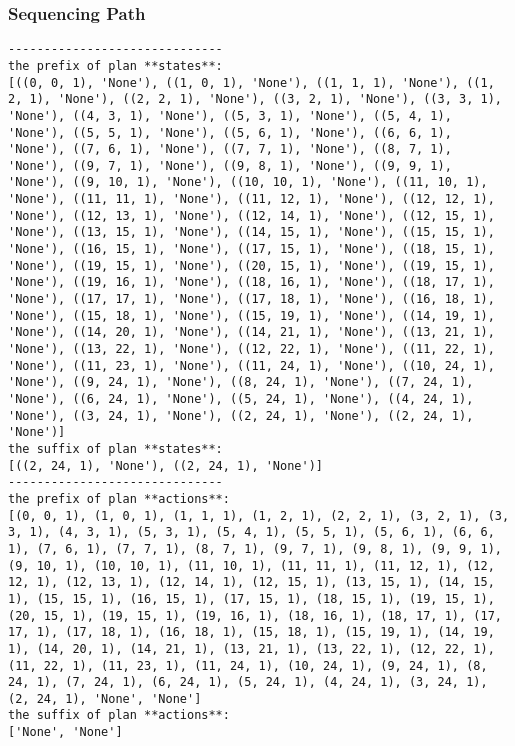 \subsubsection*{Sequencing Path}
\begin{lstlisting}
------------------------------
the prefix of plan **states**:
[((0, 0, 1), 'None'), ((1, 0, 1), 'None'), ((1, 1, 1), 'None'), ((1, 2, 1), 'None'), ((2, 2, 1), 'None'), ((3, 2, 1), 'None'), ((3, 3, 1), 'None'), ((4, 3, 1), 'None'), ((5, 3, 1), 'None'), ((5, 4, 1), 'None'), ((5, 5, 1), 'None'), ((5, 6, 1), 'None'), ((6, 6, 1), 'None'), ((7, 6, 1), 'None'), ((7, 7, 1), 'None'), ((8, 7, 1), 'None'), ((9, 7, 1), 'None'), ((9, 8, 1), 'None'), ((9, 9, 1), 'None'), ((9, 10, 1), 'None'), ((10, 10, 1), 'None'), ((11, 10, 1), 'None'), ((11, 11, 1), 'None'), ((11, 12, 1), 'None'), ((12, 12, 1), 'None'), ((12, 13, 1), 'None'), ((12, 14, 1), 'None'), ((12, 15, 1), 'None'), ((13, 15, 1), 'None'), ((14, 15, 1), 'None'), ((15, 15, 1), 'None'), ((16, 15, 1), 'None'), ((17, 15, 1), 'None'), ((18, 15, 1), 'None'), ((19, 15, 1), 'None'), ((20, 15, 1), 'None'), ((19, 15, 1), 'None'), ((19, 16, 1), 'None'), ((18, 16, 1), 'None'), ((18, 17, 1), 'None'), ((17, 17, 1), 'None'), ((17, 18, 1), 'None'), ((16, 18, 1), 'None'), ((15, 18, 1), 'None'), ((15, 19, 1), 'None'), ((14, 19, 1), 'None'), ((14, 20, 1), 'None'), ((14, 21, 1), 'None'), ((13, 21, 1), 'None'), ((13, 22, 1), 'None'), ((12, 22, 1), 'None'), ((11, 22, 1), 'None'), ((11, 23, 1), 'None'), ((11, 24, 1), 'None'), ((10, 24, 1), 'None'), ((9, 24, 1), 'None'), ((8, 24, 1), 'None'), ((7, 24, 1), 'None'), ((6, 24, 1), 'None'), ((5, 24, 1), 'None'), ((4, 24, 1), 'None'), ((3, 24, 1), 'None'), ((2, 24, 1), 'None'), ((2, 24, 1), 'None')]
the suffix of plan **states**:
[((2, 24, 1), 'None'), ((2, 24, 1), 'None')]
------------------------------
the prefix of plan **actions**:
[(0, 0, 1), (1, 0, 1), (1, 1, 1), (1, 2, 1), (2, 2, 1), (3, 2, 1), (3, 3, 1), (4, 3, 1), (5, 3, 1), (5, 4, 1), (5, 5, 1), (5, 6, 1), (6, 6, 1), (7, 6, 1), (7, 7, 1), (8, 7, 1), (9, 7, 1), (9, 8, 1), (9, 9, 1), (9, 10, 1), (10, 10, 1), (11, 10, 1), (11, 11, 1), (11, 12, 1), (12, 12, 1), (12, 13, 1), (12, 14, 1), (12, 15, 1), (13, 15, 1), (14, 15, 1), (15, 15, 1), (16, 15, 1), (17, 15, 1), (18, 15, 1), (19, 15, 1), (20, 15, 1), (19, 15, 1), (19, 16, 1), (18, 16, 1), (18, 17, 1), (17, 17, 1), (17, 18, 1), (16, 18, 1), (15, 18, 1), (15, 19, 1), (14, 19, 1), (14, 20, 1), (14, 21, 1), (13, 21, 1), (13, 22, 1), (12, 22, 1), (11, 22, 1), (11, 23, 1), (11, 24, 1), (10, 24, 1), (9, 24, 1), (8, 24, 1), (7, 24, 1), (6, 24, 1), (5, 24, 1), (4, 24, 1), (3, 24, 1), (2, 24, 1), 'None', 'None']
the suffix of plan **actions**:
['None', 'None']
\end{lstlisting}



